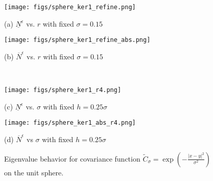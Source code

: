\documentclass[11pt]{amsart}
\begin{document}
\begin{figure}[!htb]
	\begin{center}
		\hspace{-0.6cm}
		\begin{minipage}{0.46\textwidth}
			\texttt{[image: figs/sphere\_ker1\_refine.png]}
			\caption*{(a) $\underline{N}^{\epsilon}$ vs. $r$ with fixed $\sigma=0.15$}
		\end{minipage}
		\hfil
		\begin{minipage}{0.46\textwidth}
			\texttt{[image: figs/sphere\_ker1\_refine\_abs.png]}
			\caption*{(b) $\overline{N}^{\epsilon}$ vs. $r$ with fixed $\sigma=0.15$}
		\end{minipage}
		\\
		\vspace{0.3cm}
		\hspace{-0.6cm}
		\begin{minipage}{0.46\textwidth}
			\texttt{[image: figs/sphere\_ker1\_r4.png]}
			\caption*{(c) $\underline{N}^{\epsilon}$ vs. $\sigma$ with fixed $h=0.25\sigma$}
		\end{minipage}
		\hfil
		\begin{minipage}{0.46\textwidth}
			\texttt{[image: figs/sphere\_ker1\_abs\_r4.png]}
			\caption*{(d) $\overline{N}^{\epsilon}$ vs $\sigma$ with fixed $h=0.25\sigma$}
		\end{minipage}
		\caption{Eigenvalue behavior for covariance function $\tilde{C}_{\sigma}=\exp(-\frac{|x-y|^2}{\sigma^2})$ on the unit sphere.}
		\label{fig:sphere-ker1}
	\end{center}
\end{figure}
\end{document}
